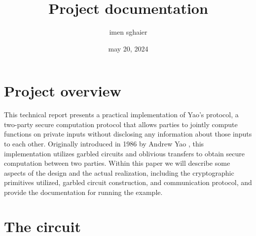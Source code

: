 \documentclass[12pt]{article}
\title{Project documentation}
\author{imen sghaier }
\date{ may 20, 2024}
\begin{document}
\maketitle

\section{Project overview}

This technical report presents a practical implementation of Yao's protocol, a two-party secure computation protocol that allows parties to jointly compute functions on private inputs without disclosing any information about those inputs to each other. Originally introduced in 1986 by Andrew Yao \cite{YAO}, this implementation utilizes garbled circuits and oblivious transfers to obtain secure computation between two parties. Within this paper we will describe some aspects of the design and the actual realization, including the cryptographic primitives utilized, garbled circuit construction, and communication protocol, and provide the documentation for running the example.

\section{The circuit}
\end{document}
